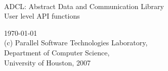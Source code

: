 \begin{titlepage}
 \begin{center}
  \vfill
  {~}
  \vfill
  \vfill
  \vfill
  \vfill
  \vfill

    {\Large
      ADCL: Abstract Data and Communication Library \\
      User level API functions \par}
  \vfill
  \today\\
  \vfill
     {\large (c) Parallel Software Technologies Laboratory, \\
       Department of Computer Science, \\
       University of Houston, 2007}\\
  \vfill
  \vfill
  \vfill
  \vfill
\end{center}                                                     
\end{titlepage}